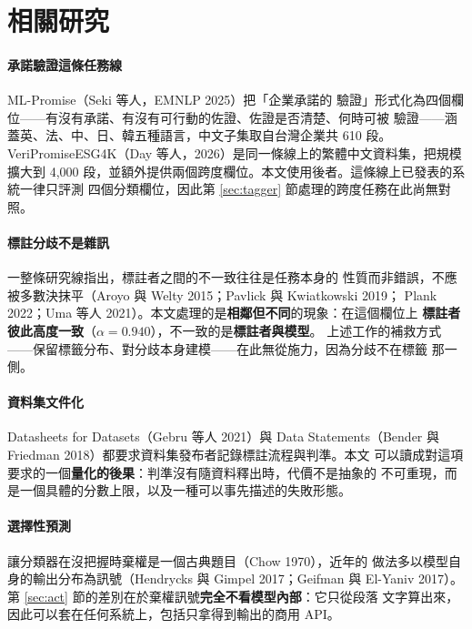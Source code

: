 \documentclass[11pt,a4paper]{ctexart}
\begin{document}
\section{相關研究}
\label{sec:related}

\paragraph{承諾驗證這條任務線} ML-Promise（Seki 等人，EMNLP 2025）把「企業承諾的
驗證」形式化為四個欄位——有沒有承諾、有沒有可行動的佐證、佐證是否清楚、何時可被
驗證——涵蓋英、法、中、日、韓五種語言，中文子集取自台灣企業共 610 段。
VeriPromiseESG4K（Day 等人，2026）是同一條線上的繁體中文資料集，把規模擴大到
4,000 段，並額外提供兩個跨度欄位。本文使用後者。這條線上已發表的系統一律只評測
四個分類欄位，因此第 \ref{sec:tagger} 節處理的跨度任務在此尚無對照。

\paragraph{標註分歧不是雜訊} 一整條研究線指出，標註者之間的不一致往往是任務本身的
性質而非錯誤，不應被多數決抹平（Aroyo 與 Welty 2015；Pavlick 與 Kwiatkowski 2019；
Plank 2022；Uma 等人 2021）。本文處理的是\textbf{相鄰但不同}的現象：在這個欄位上
\textbf{標註者彼此高度一致}（$\alpha = 0.940$），不一致的是\textbf{標註者與模型}。
上述工作的補救方式——保留標籤分布、對分歧本身建模——在此無從施力，因為分歧不在標籤
那一側。

\paragraph{資料集文件化} Datasheets for Datasets（Gebru 等人 2021）與 Data
Statements（Bender 與 Friedman 2018）都要求資料集發布者記錄標註流程與判準。本文
可以讀成對這項要求的一個\textbf{量化的後果}：判準沒有隨資料釋出時，代價不是抽象的
不可重現，而是一個具體的分數上限，以及一種可以事先描述的失敗形態。

\paragraph{選擇性預測} 讓分類器在沒把握時棄權是一個古典題目（Chow 1970），近年的
做法多以模型自身的輸出分布為訊號（Hendrycks 與 Gimpel 2017；Geifman 與 El-Yaniv
2017）。第 \ref{sec:act} 節的差別在於棄權訊號\textbf{完全不看模型內部}：它只從段落
文字算出來，因此可以套在任何系統上，包括只拿得到輸出的商用 API。
\end{document}
